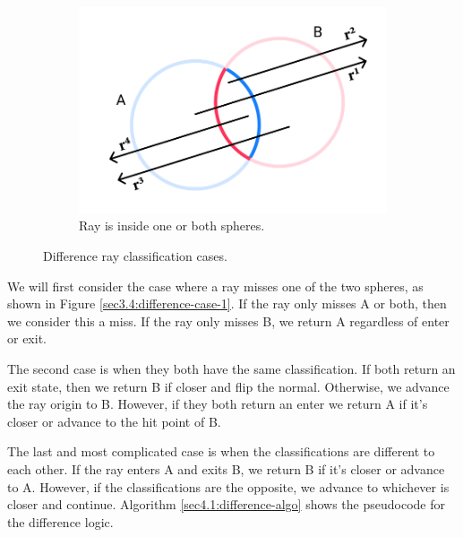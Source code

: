 \documentclass[a4paper,11pt,oneside]{article}
\begin{document}
\begin{figure}[ht]
\begin{subfigure}[b]{0.3\textwidth}
	\end{subfigure}
	\hfill
	\begin{subfigure}[b]{0.3\textwidth}
		\centering
		\includegraphics[width=\textwidth]{section4/4.1/difference-case-3.png}
		\caption{Ray is inside one or both spheres.}
		\label{sec3.4:difference-case-3}
	\end{subfigure}
	\caption{Difference ray classification cases.}
	\label{sec3.4:sphere-difference}
\end{figure}


We will first consider the case where a ray misses one of the two spheres, as shown in Figure \ref{sec3.4:difference-case-1}. If the ray only misses A or both, then we consider this a miss. If the ray only misses B, we return A regardless of enter or exit.

The second case is when they both have the same classification. If both return an exit state, then we return B if closer and flip the normal. Otherwise, we advance the ray origin to B. However, if they both return an enter we return A if it's closer or advance to the hit point of B.

The last and most complicated case is when the classifications are different to each other. If the ray enters A and exits B, we return B if it's closer or advance to A. However, if the classifications are the opposite, we advance to whichever is closer and continue. Algorithm \ref{sec4.1:difference-algo} shows the pseudocode for the difference logic.
\end{document}
